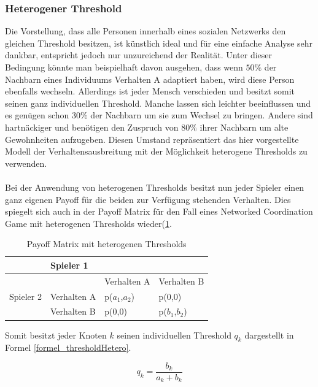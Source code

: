 \documentclass[12pt]{article}
\begin{document}
\subsubsection{Heterogener Threshold}
Die Vorstellung, dass alle Personen innerhalb eines sozialen Netzwerks den gleichen Threshold besitzen, ist künstlich ideal und für eine einfache Analyse sehr dankbar, entspricht jedoch nur unzureichend der Realität. Unter dieser Bedingung könnte man beispielhaft davon ausgehen, dass wenn $50\%$ der Nachbarn eines Individuums Verhalten A adaptiert haben, wird diese Person ebenfalls wechseln. Allerdings ist jeder Mensch verschieden und besitzt somit seinen ganz individuellen Threshold. Manche lassen sich leichter beeinflussen und es genügen schon $30\%$ der Nachbarn um sie zum Wechsel zu bringen. Andere sind hartnäckiger und benötigen den Zuspruch von $80\%$ ihrer Nachbarn um alte Gewohnheiten aufzugeben. Diesen Umstand repräsentiert das hier vorgestellte Modell der Verhaltensausbreitung mit der Möglichkeit heterogene Thresholds zu verwenden.\\\\

Bei der Anwendung von heterogenen Thresholds besitzt nun jeder Spieler einen ganz eigenen Payoff für die beiden zur Verfügung stehenden Verhalten. Dies spiegelt sich auch in der Payoff Matrix für den Fall eines Networked Coordination Game mit heterogenen Thresholds wieder(\ref{table_payofHetero}.

\begin{table}[h]
\centering
\caption{Payoff Matrix mit heterogenen Thresholds}
\label{table_payofHetero}
\begin{tabular}{|l|l|l|l|}
\hline
                           & \multicolumn{3}{l|}{Spieler 1}           \\ \hline
\multirow{3}{*}{Spieler 2} &             & Verhalten A  & Verhalten B \\ \cline{2-4} 
                           & Verhalten A & p($a_1$,$a_2$) & p(0,0)      \\ \cline{2-4} 
                           & Verhalten B & p(0,0)       & p($b_1$,$b_2$)      \\ \hline
\end{tabular}
\end{table}

Somit besitzt jeder Knoten $k$ seinen individuellen Threshold $q_k$ dargestellt in Formel \ref{formel_thresholdHetero}.

%
  \begin{equation}
 \label{formel_thresholdHetero}
 q_k =  \frac{b_k}{a_k+b_k}
 \end{equation}
\end{document}
